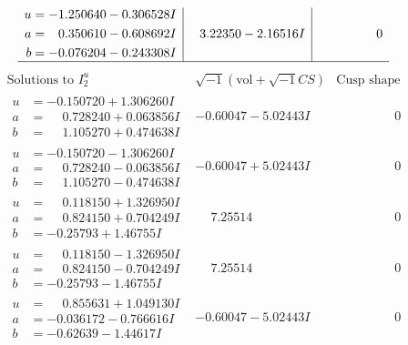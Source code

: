 \documentclass[1p]{elsarticle_modified}
\theoremstyle{definition}
\newcommand{\I}{\sqrt{-1}}
\begin{document}
$$\begin{array}{c|c|c}
\begin{aligned}
u &= -1.250640 - 0.306528 I \\
a &= \phantom{-}0.350610 - 0.608692 I \\
b &= -0.076204 - 0.243308 I\end{aligned}
 & \phantom{-}3.22350 - 2.16516 I & \phantom{-0.000000 } 0\\
 \hline 
 \end{array}$$\newpage$$\begin{array}{c|c|c}  
\text{Solutions to }I^u_{2}& \I (\text{vol} + \sqrt{-1}CS) & \text{Cusp shape}\\
 \hline 
\begin{aligned}
u &= -0.150720 + 1.306260 I \\
a &= \phantom{-}0.728240 + 0.063856 I \\
b &= \phantom{-}1.105270 + 0.474638 I\end{aligned}
 & -0.60047 - 5.02443 I & \phantom{-0.000000 } 0 \\ \hline\begin{aligned}
u &= -0.150720 - 1.306260 I \\
a &= \phantom{-}0.728240 - 0.063856 I \\
b &= \phantom{-}1.105270 - 0.474638 I\end{aligned}
 & -0.60047 + 5.02443 I & \phantom{-0.000000 } 0 \\ \hline\begin{aligned}
u &= \phantom{-}0.118150 + 1.326950 I \\
a &= \phantom{-}0.824150 + 0.704249 I \\
b &= -0.25793 + 1.46755 I\end{aligned}
 & \phantom{-}7.25514\phantom{ +0.000000I} & \phantom{-0.000000 } 0 \\ \hline\begin{aligned}
u &= \phantom{-}0.118150 - 1.326950 I \\
a &= \phantom{-}0.824150 - 0.704249 I \\
b &= -0.25793 - 1.46755 I\end{aligned}
 & \phantom{-}7.25514\phantom{ +0.000000I} & \phantom{-0.000000 } 0 \\ \hline\begin{aligned}
u &= \phantom{-}0.855631 + 1.049130 I \\
a &= -0.036172 - 0.766616 I \\
b &= -0.62639 - 1.44617 I\end{aligned}
 & -0.60047 - 5.02443 I & \phantom{-0.000000 } 0 \\ \hline\begin{aligned}

\end{aligned}
\end{array}$$
\end{document}
